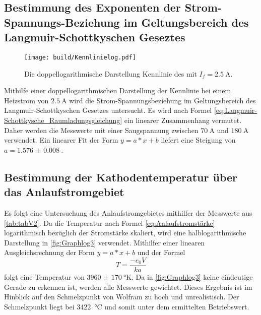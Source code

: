 \subsection{Bestimmung des Exponenten der Strom-Spannungs-Beziehung im Geltungsbereich des Langmuir-Schottkyschen Geseztes}
\begin{figure}
 \centering
 \caption{Die doppellogarithmische Darstellung Kennlinie des mit $I_f = \SI{2.5}{\ampere}$.}
 \texttt{[image: build/Kennlinielog.pdf]}
 \label{fig:Graphlog2}
\end{figure}
Mithilfe einer doppellogarithmischen Darstellung der Kennlinie bei einem Heizstrom von $\SI{2.5}{\ampere}$
 wird die Strom-Spannungsbeziehung im Geltungsbereich des Langmuir-Schottkyschen Gesetzes untersucht.
 Es wird nach Formel \ref{eq:Langmuir-Schottkysche_Raumladungsgleichung} ein linearer Zusammenhang vermutet.
Daher werden die Messwerte mit einer Saugspannung zwischen $\SI{70}{\ampere}$
und $\SI{180}{\ampere}$ verwendet. Ein linearer Fit der Form $y = a*x+b$ liefert
eine Steigung von $a = \SI{1.576(8)}{}$.























\subsection{Bestimmung der Kathodentemperatur über das Anlaufstromgebiet}
Es folgt eine Untersuchung des Anlaufstromgebietes mithilfer der Messwerte aus \ref{tab:tabV2}.
Da die Temperatur nach Formel \ref{eq:Anlaufstromstärke} logarithmisch bezüglich
der Stromstärke skaliert, wird eine halblogarithmische Darstellung in
\ref{fig:Graphlog3} verwendet. Mithilfer einer linearen Ausgleichsrechnung der Form
$y = a*x+b$ und der Formel
\begin{equation}
  T = \frac{-e_0 V}{k a}
  \end{equation}
  folgt eine Temperatur von $\SI{3960(170)}{\degree\kelvin}$. Da in \ref{fig:Graphlog3}
  keine eindeutige Gerade zu erkennen ist,
werden alle Messwerte gewichtet. Dieses Ergebnis ist im Hinblick auf den
 Schmelzpunkt von Wolfram zu hoch und unrealistisch. Der Schmelzpunkt liegt bei
 \SI{3422}{\degreeCelsius} \cite{wolfschmelz} und somit unter dem ermittelten Betriebswert.


